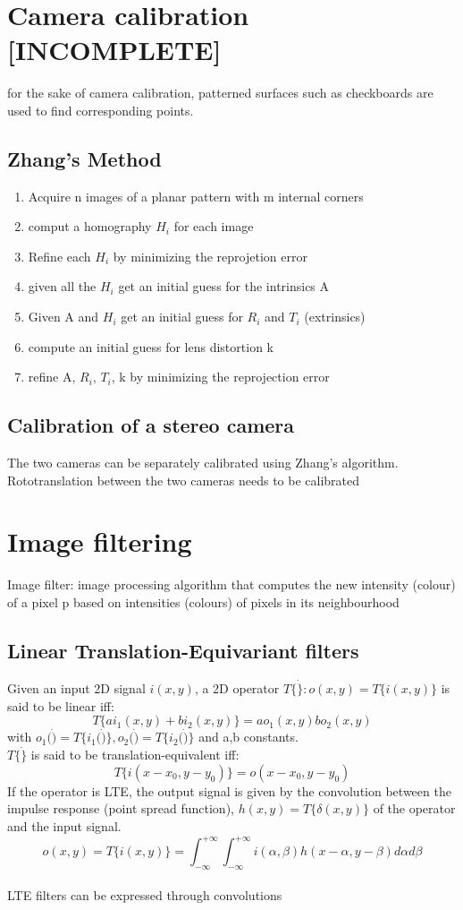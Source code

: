 \documentclass{article}
\begin{document}
\section{Camera calibration [INCOMPLETE]}
for the sake of camera calibration, patterned surfaces such as checkboards are used to find corresponding points.
\subsection{Zhang's Method}
\begin{enumerate}
    \item Acquire n images of a planar pattern with m internal corners
    \item comput a homography $H_i$ for each image
    \item Refine each $H_i$ by minimizing the reprojetion error
    \item given all the $H_i$ get an initial guess for the intrinsics A
    \item Given A and $H_i$ get an initial guess for $R_i$ and $T_i$ (extrinsics)
    \item compute an initial guess for lens distortion k
    \item refine A, $R_i$, $T_i$, k by minimizing the reprojection error
\end{enumerate}

\subsection{Calibration of a stereo camera}
The two cameras can be separately calibrated using Zhang's algorithm.\\
Rototranslation between the two cameras needs to be calibrated

\section{Image filtering}
Image filter: image processing algorithm that computes the new intensity (colour) of a pixel p based on intensities (colours) of pixels in its neighbourhood\\
\subsection{Linear Translation-Equivariant filters}
Given an input 2D signal $i(x,y)$, a 2D operator $T\{\dot\}:o(x,y)=T\{i(x,y)\}$ is said to be linear iff:
$$T\{ai_1(x,y)+bi_2(x,y)\}=ao_1(x,y)bo_2(x,y)$$ with $o_1(\dot)=T\{i_1(\dot)\}, o_2(\dot)=T\{i_2(\dot)\}$ and a,b constants.\\
$T\{\dot\}$ is said to be translation-equivalent iff:
$$T\{i(x-x_0,y-y_0)\}=o(x-x_0,y-y_0)$$
If the operator is LTE, the output signal is given by the convolution between the impulse response (point spread function), $h(x,y)=T\{\delta(x,y)\}$ of the operator and the input signal.\\
$$o(x,y)=T\{i(x,y)\}=\int_{-\infty}^{+\infty} \int_{-\infty}^{+\infty} i(\alpha,\beta)h(x-\alpha,y-\beta)d\alpha d\beta$$\\
LTE filters can be expressed through convolutions
\end{document}
